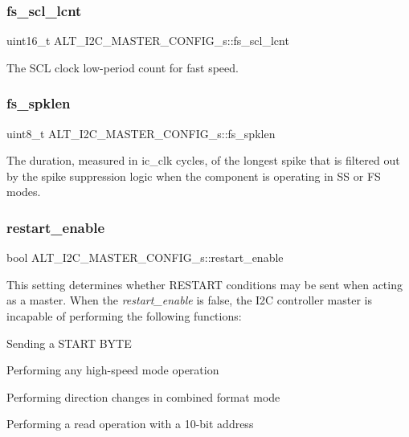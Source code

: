 \subsubsection{\texorpdfstring{fs\_scl\_lcnt}{fs\_scl\_lcnt}}
{\footnotesize\ttfamily uint16\+\_\+t A\+L\+T\+\_\+\+I2\+C\+\_\+\+M\+A\+S\+T\+E\+R\+\_\+\+C\+O\+N\+F\+I\+G\+\_\+s\+::fs\+\_\+scl\+\_\+lcnt}

The S\+CL clock low-\/period count for fast speed. \mbox{\label{structALT__I2C__MASTER__CONFIG__s_aa453abc962f00a779d23150799c9be9d}} 
\subsubsection{\texorpdfstring{fs\_spklen}{fs\_spklen}}
{\footnotesize\ttfamily uint8\+\_\+t A\+L\+T\+\_\+\+I2\+C\+\_\+\+M\+A\+S\+T\+E\+R\+\_\+\+C\+O\+N\+F\+I\+G\+\_\+s\+::fs\+\_\+spklen}

The duration, measured in ic\+\_\+clk cycles, of the longest spike that is filtered out by the spike suppression logic when the component is operating in SS or FS modes. \mbox{\label{structALT__I2C__MASTER__CONFIG__s_ae1dcf3ffffc1274129e15d18d2093a43}} 
\subsubsection{\texorpdfstring{restart\_enable}{restart\_enable}}
{\footnotesize\ttfamily bool A\+L\+T\+\_\+\+I2\+C\+\_\+\+M\+A\+S\+T\+E\+R\+\_\+\+C\+O\+N\+F\+I\+G\+\_\+s\+::restart\+\_\+enable}

This setting determines whether R\+E\+S\+T\+A\+RT conditions may be sent when acting as a master. When the {\itshape restart\+\_\+enable} is false, the I2C controller master is incapable of performing the following functions\+:
\begin{DoxyItemize}
\item Sending a S\+T\+A\+RT B\+Y\+TE
\item Performing any high-\/speed mode operation
\item Performing direction changes in combined format mode
\item Performing a read operation with a 10-\/bit address 
\end{DoxyItemize}\mbox{\label{structALT__I2C__MASTER__CONFIG__s_a4f335cf08b9832cf923796860f09bd05}} 
